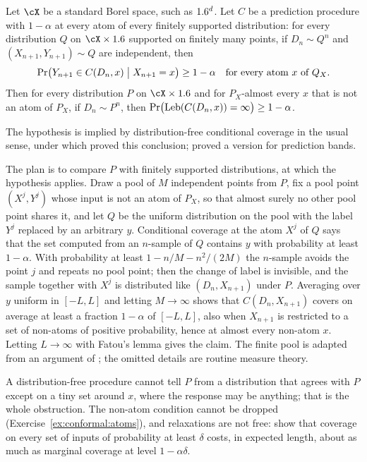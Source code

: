 \begin{refsection}
\begin{theorem}\label{thm:conformal:impossible}
Let $\cX$ be a standard Borel space, such as $1.6^d$. Let $C$ be a prediction procedure with  $1-\alpha$ at every atom of every finitely supported distribution: for every distribution $Q$ on $\cX\times\R$ supported on finitely many points, if $D_n\sim Q^n$ and $(X_{n+1},Y_{n+1})\sim Q$ are independent, then
\[
\Pr\bigl(Y_{n+1}\in C(D_n,x)\bigm| X_{n+1}=x\bigr)\ge1-\alpha\quad\text{for every atom $x$ of $Q_X$.}
\]
Then for every distribution $P$ on $\cX\times\R$ and for $P_X$-almost every $x$ that is not an atom of $P_X$, if $D_n\sim P^n$, then $\Pr\bigl(\operatorname{Leb}(C(D_n,x))=\infty\bigr)\ge1-\alpha$.
\end{theorem}

The hypothesis is implied by distribution-free conditional coverage in the usual sense, under which \textcite{Vovk2012} proved this conclusion; \textcite{LeiWasserman2014} proved a version for prediction bands.

\begin{proofsketch}
The plan is to compare $P$ with finitely supported distributions, at which the hypothesis applies. Draw a pool of $M$ independent points from $P$, fix a pool point $(X^j,Y^j)$ whose input is not an atom of $P_X$, so that almost surely no other pool point shares it, and let $Q$ be the uniform distribution on the pool with the label $Y^j$ replaced by an arbitrary $y$. Conditional coverage at the atom $X^j$ of $Q$ says that the set computed from an $n$-sample of $Q$ contains $y$ with probability at least $1-\alpha$. With probability at least $1-n/M-n^2/(2M)$ the $n$-sample avoids the point $j$ and repeats no pool point; then the change of label is invisible, and the sample together with $X^j$ is distributed like $(D_n,X_{n+1})$ under $P$. Averaging over $y$ uniform in $[-L,L]$ and letting $M\to\infty$ shows that $C(D_n,X_{n+1})$ covers on average at least a fraction $1-\alpha$ of $[-L,L]$, also when $X_{n+1}$ is restricted to a set of non-atoms of positive probability, hence at almost every non-atom $x$. Letting $L\to\infty$ with Fatou's lemma gives the claim. The finite pool is adapted from an argument of \textcite{Barber2021b}; the omitted details are routine measure theory.
\end{proofsketch}

A distribution-free procedure cannot tell $P$ from a distribution that agrees with $P$ except on a tiny set around $x$, where the response may be anything; that is the whole obstruction. The non-atom condition cannot be dropped (Exercise~\ref{ex:conformal:atoms}), and relaxations are not free: \textcite{Barber2021b} show that coverage on every set of inputs of probability at least $\delta$ costs, in expected length, about as much as marginal coverage at level $1-\alpha\delta$.


\end{refsection}
